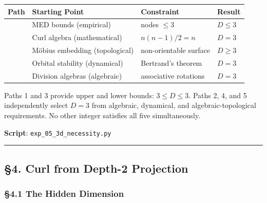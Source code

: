 \documentclass[
  11pt,
  a4paper]{article}
\begin{document}
\begin{longtable}[]{@{}
  >{\raggedright\arraybackslash}p{}
  >{\raggedright\arraybackslash}p{}
  >{\raggedright\arraybackslash}p{}
  >{\raggedright\arraybackslash}p{}@{}}
\toprule\noalign{}
\begin{minipage}[b]{\linewidth}\raggedright
Path
\end{minipage} & \begin{minipage}[b]{\linewidth}\raggedright
Starting Point
\end{minipage} & \begin{minipage}[b]{\linewidth}\raggedright
Constraint
\end{minipage} & \begin{minipage}[b]{\linewidth}\raggedright
Result
\end{minipage} \\
\midrule\noalign{}
\endhead
\bottomrule\noalign{}
\endlastfoot
1 & MED bounds (empirical) & nodes \(\leq 3\) & \(D \leq 3\) \\
2 & Curl algebra (mathematical) & \(n(n-1)/2 = n\) & \(D = 3\) \\
3 & Möbius embedding (topological) & non-orientable surface &
\(D \geq 3\) \\
4 & Orbital stability (dynamical) & Bertrand's theorem & \(D = 3\) \\
5 & Division algebras (algebraic) & associative rotations & \(D = 3\) \\
\end{longtable}

Paths 1 and 3 provide upper and lower bounds: \(3 \leq D \leq 3\). Paths
2, 4, and 5 independently select \(D = 3\) from algebraic, dynamical,
and algebraic-topological requirements. No other integer satisfies all
five simultaneously.

\textbf{Script}: \texttt{exp\_05\_3d\_necessity.py}

\begin{center}\rule{0.5\linewidth}{0.5pt}\end{center}

\subsection{§4. Curl from Depth-2
Projection}\label{curl-from-depth-2-projection}

\subsubsection{§4.1 The Hidden Dimension}\label{the-hidden-dimension}
\end{document}
